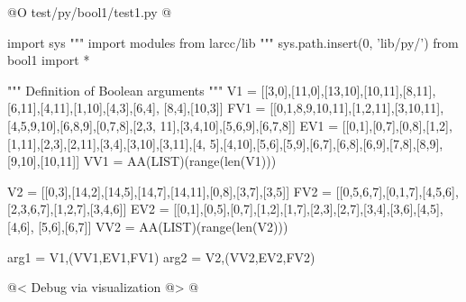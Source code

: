 \documentclass[11pt,oneside]{article}	%
\begin{document}
@O test/py/bool1/test1.py
@{
import sys
""" import modules from larcc/lib """
sys.path.insert(0, 'lib/py/')
from bool1 import *

""" Definition of Boolean arguments """
V1 = [[3,0],[11,0],[13,10],[10,11],[8,11],[6,11],[4,11],[1,10],[4,3],[6,4],
		[8,4],[10,3]]
FV1 = [[0,1,8,9,10,11],[1,2,11],[3,10,11],[4,5,9,10],[6,8,9],[0,7,8],[2,3,
		11],[3,4,10],[5,6,9],[6,7,8]]
EV1 = [[0,1],[0,7],[0,8],[1,2],[1,11],[2,3],[2,11],[3,4],[3,10],[3,11],[4,
		5],[4,10],[5,6],[5,9],[6,7],[6,8],[6,9],[7,8],[8,9],[9,10],[10,11]]
VV1 = AA(LIST)(range(len(V1)))

V2 = [[0,3],[14,2],[14,5],[14,7],[14,11],[0,8],[3,7],[3,5]]
FV2 = [[0,5,6,7],[0,1,7],[4,5,6],[2,3,6,7],[1,2,7],[3,4,6]]
EV2 = [[0,1],[0,5],[0,7],[1,2],[1,7],[2,3],[2,7],[3,4],[3,6],[4,5],[4,6],
		[5,6],[6,7]]
VV2 = AA(LIST)(range(len(V2)))

arg1 = V1,(VV1,EV1,FV1)
arg2 = V2,(VV2,EV2,FV2)

@< Debug via visualization @>
@}
\end{document}
